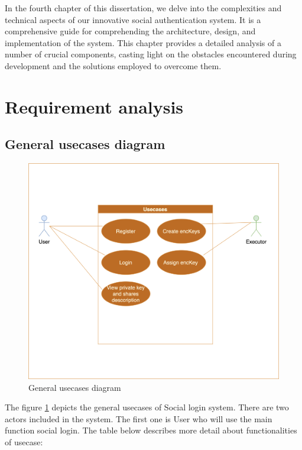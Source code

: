 \documentclass[../Main.tex]{subfiles}
\begin{document}
In the fourth chapter of this dissertation, we delve into the complexities and technical aspects of our innovative social authentication system. It is a comprehensive guide for comprehending the architecture, design, and implementation of the system. This chapter provides a detailed analysis of a number of crucial components, casting light on the obstacles encountered during development and the solutions employed to overcome them.
\section{Requirement analysis}
\subsection{General usecases diagram}
\begin{figure}[H]
 \centering
 \includegraphics[scale=0.14]{Figure/general-usecases.png}
 \caption{General usecases diagram}
    \label{fig:general-usecases}
\end{figure}
The figure \ref{fig:general-usecases} depicts the general usecases of Social login system. There are two actors included in the system.
The first one is User who will use the main function social login. The table below describes more detail about functionalities of usecase:\\
\end{document}
